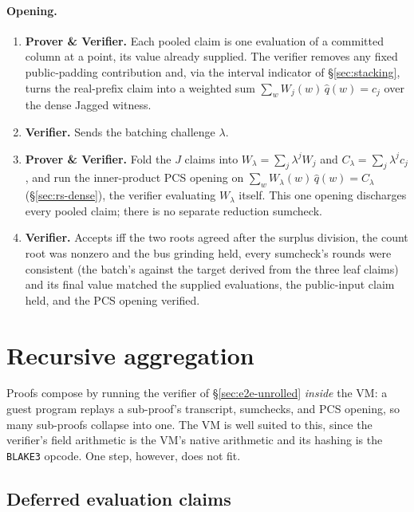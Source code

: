 \documentclass[11pt]{article}
\begin{document}
\paragraph{Opening.}
\begin{enumerate}
\item \textbf{Prover \& Verifier.} Each pooled claim is one evaluation of a committed column at a point, its value already supplied.  The verifier removes any fixed public-padding contribution and, via the interval indicator of \S\ref{sec:stacking}, turns the real-prefix claim into a weighted sum $\sum_w W_j(w)\,\widehat q(w)=c_j$ over the dense Jagged witness.
\item \textbf{Verifier.} Sends the batching challenge $\lambda$.
\item \textbf{Prover \& Verifier.} Fold the $J$ claims into $W_\lambda=\sum_j\lambda^{j}W_j$ and $C_\lambda=\sum_j\lambda^{j}c_j$, and run the inner-product PCS opening on $\sum_w W_\lambda(w)\,\widehat q(w)=C_\lambda$ (\S\ref{sec:rs-dense}), the verifier evaluating $W_\lambda$ itself. This one opening discharges every pooled claim; there is no separate reduction sumcheck.
\item \textbf{Verifier.} Accepts iff the two roots agreed after the surplus division, the count root was nonzero and the bus grinding held, every sumcheck's rounds were consistent (the batch's against the target derived from the three leaf claims) and its final value matched the supplied evaluations, the public-input claim held, and the PCS opening verified.
\end{enumerate}

\section{Recursive aggregation}\label{sec:recursion}

Proofs compose by running the verifier of \S\ref{sec:e2e-unrolled} \emph{inside} the VM: a guest program replays a sub-proof's transcript, sumchecks, and PCS opening, so many sub-proofs collapse into one. The VM is well suited to this, since the verifier's field arithmetic is the VM's native arithmetic and its hashing is the \texttt{BLAKE3} opcode. One step, however, does not fit.

\subsection{Deferred evaluation claims}\label{sec:deferred-claims}
\end{document}

